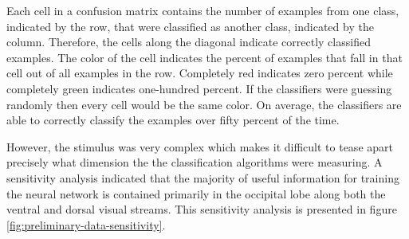 \documentclass[12pt]{article}
\begin{document}
Each cell in a confusion matrix contains the number of examples from one class, indicated by the row, that were classified as another class, indicated by the column.
Therefore, the cells along the diagonal indicate correctly classified examples.
The color of the cell indicates the percent of examples that fall in that cell out of all examples in the row.
Completely red indicates zero percent while completely green indicates one-hundred percent.
If the classifiers were guessing randomly then every cell would be the same color.
On average, the classifiers are able to correctly classify the examples over fifty percent of the time.

However, the stimulus was very complex which makes it difficult to tease apart precisely what dimension the the classification algorithms were measuring.
A sensitivity analysis indicated that the majority of useful information for training the neural network is contained primarily in the occipital lobe along both the ventral and dorsal visual streams.
This sensitivity analysis is presented in figure \ref{fig:preliminary-data-sensitivity}.
\end{document}

